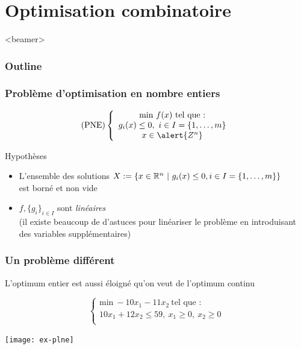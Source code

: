 \documentclass{beamer}
\newcommand{\R}{{\ensuremath\mathbb{R}}}
\begin{document}
\section{Optimisation combinatoire}

\begin{frame}<beamer>
  \frametitle{Outline}
  \tableofcontents[currentsection]
\end{frame}

\begin{frame}
  \frametitle{Problème d'optimisation en nombre entiers}
  
  \[
  \text{(PNE)} \left\{
  \begin{array}{c}
    \text{min} \ f(x) \ \text{tel que :} \\
    g_i(x) \leq 0, \ i \in I = \{1, \dots, m\} \\
    x \in \alert{Z^n}
  \end{array}
  \right.
  \]

  \begin{block}{Hypothèses}
    \begin{itemize}
    \item L'ensemble des solutions $X := \{ x \in \R^n \ | \ g_i(x) \leq 0, i \in I = \{1, \dots, m\} \}$ \\
      est borné et non vide
    \item $f, \{g_i\}_{i \in I}$ sont \emph{linéaires} \\
      (il existe beaucoup de d'astuces pour
      linéariser le problème en introduisant des variables supplémentaires)
    \end{itemize}
  \end{block}
\end{frame}



\begin{frame}
  \frametitle{Un problème différent}

\alert{L'optimum entier est aussi éloigné qu'on veut de l'optimum continu}

  \[
  \left\{
  \begin{array}{c}
    \text{min} \ -10x_1 - 11x_2 \ \text{tel que :} \\
    10x_1 + 12x_2 \leq 59, \ x_1 \geq 0, \ x_2 \geq 0 \\
  \end{array}
  \right.
  \]

  \begin{center}
    \texttt{[image: ex-plne]}
  \end{center}
\end{frame}
\end{document}
